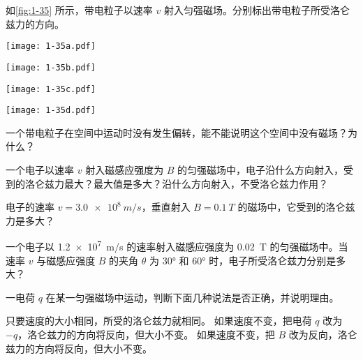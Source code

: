 \begin{Practice}
\begin{question}
    \item 如\cref{fig:1-35} 所示，带电粒子以速率 $v$ 射入匀强磁场。分别标出带电粒子所受洛仑兹力的方向。
    \begin{figurehere}
      \begin{minipage}{\linewidth}
      \begin{minipage}{0.25\linewidth}\centering
        \texttt{[image: 1-35a.pdf]}
        \subcaption{}\label{fig:1-35a}
      \end{minipage}%
      \begin{minipage}{0.25\linewidth}\centering
        \texttt{[image: 1-35b.pdf]}
        \subcaption{}\label{fig:1-35b}
      \end{minipage}%
      \begin{minipage}{0.25\linewidth}\centering
        \texttt{[image: 1-35c.pdf]}
        \subcaption{}\label{fig:1-35c}
      \end{minipage}%
      \begin{minipage}{0.25\linewidth}\centering
        \texttt{[image: 1-35d.pdf]}
        \subcaption{}\label{fig:1-35d}
      \end{minipage}
      \caption{}\label{fig:1-35}
      \end{minipage}
    \end{figurehere}	
    \item 一个带电粒子在空间中运动时没有发生偏转，能不能说明这个空间中没有磁场？为什么？
    \item 一个电子以速率 $v$ 射入磁感应强度为 $B$ 的匀强磁场中，电子沿什么方向射入，受到的洛仑兹力最大？最大值是多大？沿什么方向射入，不受洛仑兹力作用？
    \item 电子的速率 $v=\qty{3.0e8}{m/s}$，垂直射入 $B=\qty{0.1}{T}$ 的磁场中，它受到的洛仑兹力是多大？
    \item 一个电子以 \qty{1.2e7}{m/s} 的速率射入磁感应强度为 \qty{0.02}{T} 的匀强磁场中。当速率 $v$ 与磁感应强度 $B$ 的夹角 $\theta$ 为 \ang{30} 和 \ang{60} 时，电子所受洛仑兹力分别是多大？
    \item 一电荷 $q$ 在某一匀强磁场中运动，判断下面几种说法是否正确，并说明理由。
    \begin{tasks}
      \task 只要速度的大小相同，所受的洛仑兹力就相同。
      \task 如果速度不变，把电荷 $q$ 改为 $-q$，洛仑兹力的方向将反向，但大小不变。
      \task 如果速度不变，把 $B$ 改为反向，洛仑兹力的方向将反向，但大小不变。
    \end{tasks}
\end{question}
\end{Practice}

